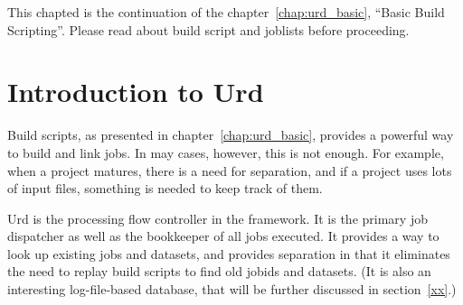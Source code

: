 
\label{chap:urd}

This chapted is the continuation of the chapter~\ref{chap:urd_basic},
``Basic Build Scripting''.  Please read about build script and
joblists before proceeding.


\section{Introduction to Urd}

Build scripts, as presented in chapter~\ref{chap:urd_basic}, provides
a powerful way to build and link jobs.  In may cases, however, this is
not enough.  For example, when a project matures, there is a need for
separation, and if a project uses lots of input files, something is
needed to keep track of them.

Urd is the processing flow controller in the framework.  It is the
primary job dispatcher as well as the bookkeeper of all jobs executed.
It provides a way to look up existing jobs and datasets, and provides
separation in that it eliminates the need to replay build scripts to
find old jobids and datasets.  (It is also an interesting
log-file-based database, that will be further discussed in
section~\ref{xx}.)

